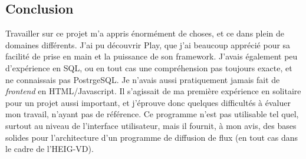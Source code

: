 \documentclass[french]{article}
\begin{document}
\subsection{Conclusion}

Travailler sur ce projet m'a appris énormément de choses, et ce dans plein de domaines différents. J'ai pu découvrir Play, que j'ai beaucoup apprécié pour sa facilité de prise en main et la puissance de son framework. J'avais également peu d'expérience en SQL, ou en tout cas une compréhension pas toujours exacte, et ne connaissais pas PostrgeSQL. Je n'avais aussi pratiquement jamais fait de \textit{frontend} en HTML/Javascript.\newline
 Il s'agissait de ma première expérience en solitaire pour un projet aussi important, et j'éprouve donc quelques difficultés à évaluer mon travail, n'ayant pas de référence. Ce programme n'est pas utilisable tel quel, surtout au niveau de l'interface utilisateur, mais il fournit, à mon avis, des bases solides pour l'architecture d'un programme de diffusion de flux (en tout cas dans le cadre de l'HEIG-VD). 
 
\end{document}
